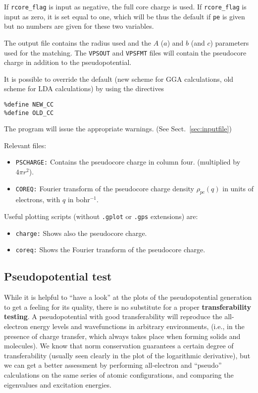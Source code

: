 \documentclass[11pt]{article}
\begin{document}
If {\tt rcore\_flag} is input as negative, the full core charge is used.
If {\tt rcore\_flag} is input as zero, it is set equal to one, which will be
thus the default if {\tt pe} is given but no numbers are given for these
two variables.

The output file contains the radius used and the $A$ ($a$) and $b$ (and $c$)
parameters used for the matching. The {\tt VPSOUT} and {\tt VPSFMT}
files will  contain the pseudocore charge in addition to the pseudopotential.

It is possible to override the default (new scheme for GGA
calculations, old scheme for LDA calculations) by using the directives
\begin{verbatim}
%define NEW_CC
%define OLD_CC
\end{verbatim}
The program will issue the appropriate warnings. (See Sect.~\ref{sec:inputfile})

Relevant files:

\begin{itemize}
\item  {\tt PSCHARGE:} Contains the pseudocore charge in column four.
(multiplied by $4\pi r^2$).

\item {\tt COREQ:} Fourier transform of the pseudocore charge density
$\rho_{pc}(q)$ in units of electrons, with $q$ in  bohr$^{-1}$.
\end{itemize}

Useful plotting scripts (without {\tt .gplot} or {\tt .gps}
extensions) are:

\begin{itemize}
\item {\tt charge:} Shows also the pseudocore charge.
\item {\tt coreq:}  Shows the Fourier transform of the pseudocore charge.
\end{itemize}

\subsection{Pseudopotential test}

While it is helpful to ``have a look'' at the plots of the
pseudopotential generation to get a feeling for its quality, there is
no substitute for a proper {\bf transferability testing}. A
pseudopotential with good transferability will reproduce the
all-electron energy levels and wavefunctions in arbitrary
environments, (i.e., in the presence of charge transfer, which always
takes place when forming solids and molecules).  We know that norm
conservation guarantees a certain degree of transferability (usually
seen clearly in the plot of the logarithmic derivative), but we can
get a better assessment by performing all-electron and ``pseudo''
calculations on the same series of atomic configurations, and comparing
the eigenvalues and excitation energies.
\end{document}
